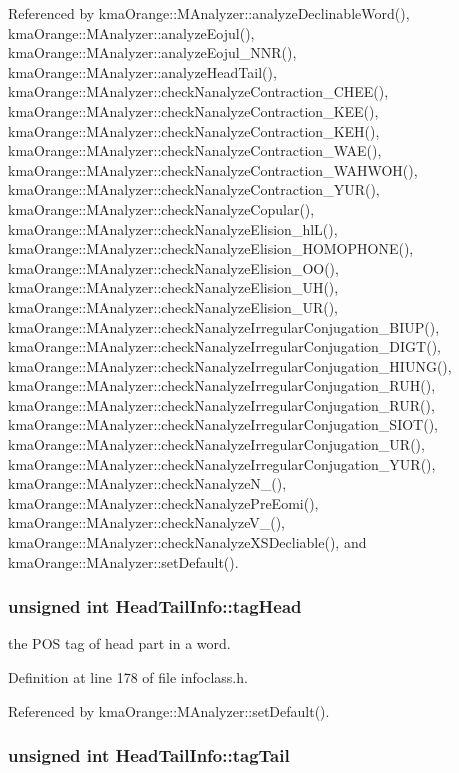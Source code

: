 Referenced by kmaOrange::MAnalyzer::analyzeDeclinableWord(), kmaOrange::MAnalyzer::analyzeEojul(), kmaOrange::MAnalyzer::analyzeEojul\_\-NNR(), kmaOrange::MAnalyzer::analyzeHeadTail(), kmaOrange::MAnalyzer::checkNanalyzeContraction\_\-CHEE(), kmaOrange::MAnalyzer::checkNanalyzeContraction\_\-KEE(), kmaOrange::MAnalyzer::checkNanalyzeContraction\_\-KEH(), kmaOrange::MAnalyzer::checkNanalyzeContraction\_\-WAE(), kmaOrange::MAnalyzer::checkNanalyzeContraction\_\-WAHWOH(), kmaOrange::MAnalyzer::checkNanalyzeContraction\_\-YUR(), kmaOrange::MAnalyzer::checkNanalyzeCopular(), kmaOrange::MAnalyzer::checkNanalyzeElision\_\-hlL(), kmaOrange::MAnalyzer::checkNanalyzeElision\_\-HOMOPHONE(), kmaOrange::MAnalyzer::checkNanalyzeElision\_\-OO(), kmaOrange::MAnalyzer::checkNanalyzeElision\_\-UH(), kmaOrange::MAnalyzer::checkNanalyzeElision\_\-UR(), kmaOrange::MAnalyzer::checkNanalyzeIrregularConjugation\_\-BIUP(), kmaOrange::MAnalyzer::checkNanalyzeIrregularConjugation\_\-DIGT(), kmaOrange::MAnalyzer::checkNanalyzeIrregularConjugation\_\-HIUNG(), kmaOrange::MAnalyzer::checkNanalyzeIrregularConjugation\_\-RUH(), kmaOrange::MAnalyzer::checkNanalyzeIrregularConjugation\_\-RUR(), kmaOrange::MAnalyzer::checkNanalyzeIrregularConjugation\_\-SIOT(), kmaOrange::MAnalyzer::checkNanalyzeIrregularConjugation\_\-UR(), kmaOrange::MAnalyzer::checkNanalyzeIrregularConjugation\_\-YUR(), kmaOrange::MAnalyzer::checkNanalyzeN\_\-(), kmaOrange::MAnalyzer::checkNanalyzePreEomi(), kmaOrange::MAnalyzer::checkNanalyzeV\_\-(), kmaOrange::MAnalyzer::checkNanalyzeXSDecliable(), and kmaOrange::MAnalyzer::setDefault().\hypertarget{classHeadTailInfo_72bdf86b43f7686bc5ea5fdd823e6f44}{
\subsubsection[{tagHead}]{\setlength{\rightskip}{0pt plus 5cm}unsigned int {\bf HeadTailInfo::tagHead}}}
\label{classHeadTailInfo_72bdf86b43f7686bc5ea5fdd823e6f44}


the POS tag of head part in a word. 



Definition at line 178 of file infoclass.h.

Referenced by kmaOrange::MAnalyzer::setDefault().\hypertarget{classHeadTailInfo_34d4df1cd05943843a8055059e3afefb}{
\subsubsection[{tagTail}]{\setlength{\rightskip}{0pt plus 5cm}unsigned int {\bf HeadTailInfo::tagTail}}}
\label{classHeadTailInfo_34d4df1cd05943843a8055059e3afefb}


